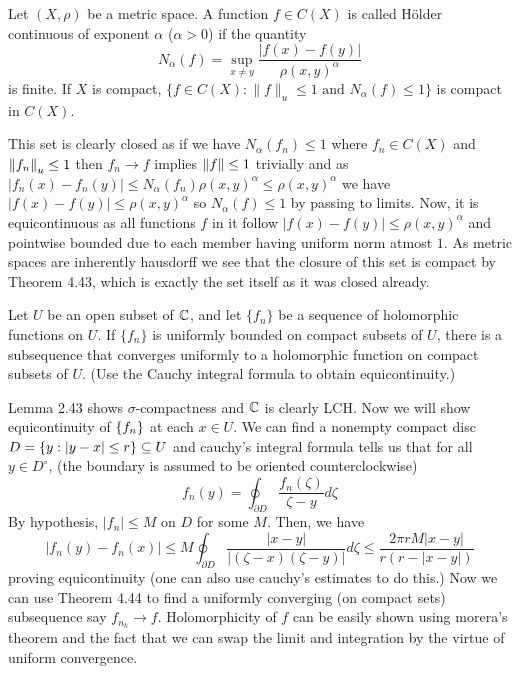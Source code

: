 \documentclass[12pt,a4paper]{article}
\begin{document}
\begin{problem}\label{prob:4-64}
Let $(X,\rho)$ be a metric space. A function $f \in C(X)$ is called H\"older continuous of exponent $\alpha$ ($\alpha > 0$) if the quantity
\[ N_\alpha(f) = \sup_{x \neq y} \frac{|f(x) - f(y)|}{\rho(x,y)^\alpha} \]
is finite. If $X$ is compact, $\{f \in C(X) : \|f\|_u \le 1 \text{ and } N_\alpha(f) \le 1\}$ is compact in $C(X)$.
\end{problem}
\begin{solution}
    This set is clearly closed as if we have $N_\alpha(f_n)\leq 1$ where $f_n\in C(X)$ and $\norm{f_n}_u\leq 1$ then $f_n\to f$ implies $\norm{f}\leq 1$ trivially and as $|f_n(x)-f_n(y)|\leq N_\alpha(f_n)\rho(x,y)^\alpha\leq\rho(x,y)^\alpha$ we have $|f(x)-f(y)|\leq\rho(x,y)^\alpha$ so $N_\alpha(f)\leq 1$ by passing to limits. 
    Now, it is equicontinuous as all functions $f$ in it follow $|f(x)-f(y)|\leq\rho(x,y)^\alpha$ and pointwise bounded due to each member having uniform norm atmost $1.$ 
    As metric spaces are inherently hausdorff we see that the closure of this set is compact by Theorem 4.43, which is exactly the set itself as it was closed already. 
\end{solution}
\begin{problem}\label{prob:4-65}
Let $U$ be an open subset of $\mathbb{C}$, and let $\{f_n\}$ be a sequence of holomorphic functions on $U$. If $\{f_n\}$ is uniformly bounded on compact subsets of $U$, there is a subsequence that converges uniformly to a holomorphic function on compact subsets of $U$. (Use the Cauchy integral formula to obtain equicontinuity.)
\end{problem}
\begin{solution}
Lemma 2.43 shows $\sigma$-compactness and $\mathbb{C}$ is clearly LCH. 
Now we will show equicontinuity of $ \qty{f_n}$ at each $x\in U.$ 
We can find a nonempty compact disc $D=\qty{y:|y-x|\leq r} \subseteq U$ and cauchy's integral formula tells us that for all $y\in D^\circ$, (the boundary is assumed to be oriented counterclockwise)
\[
    f_n(y)=\oint_{\partial D} \frac{f_n(\zeta)}{\zeta-y}d\zeta
\]
By hypothesis, $|f_n|\leq M$ on $D$ for some $M.$ 
Then, we have 
\[
    |f_n(y)-f_n(x)|\leq M\oint_{\partial D} \frac{|x-y|}{|(\zeta-x)(\zeta-y)|}d\zeta\leq\frac{2\pi r M|x-y|}{r(r-|x-y|)}
\]
proving equicontinuity (one can also use cauchy's estimates to do this.) 
Now we can use Theorem 4.44 to find a uniformly converging (on compact sets) subsequence say $f_{n_k}\to f.$ 
Holomorphicity of $f$ can be easily shown using morera's theorem and the fact that we can swap the limit and integration by the virtue of uniform convergence. 

\end{solution}
\end{document}

